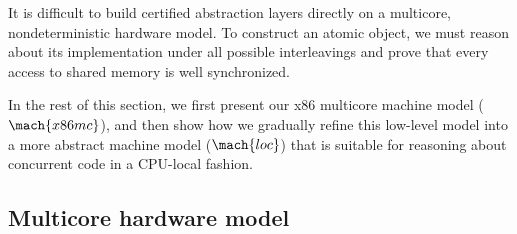  
It is difficult to build certified abstraction layers directly on a
multicore, nondeterministic hardware model. To construct an atomic
object, we must reason about its implementation under all possible
interleavings and prove that every access to shared memory is well
synchronized.


In the rest of this section, we first present our x86 multicore
machine model ($\mach{x86mc}$), and then show how we gradually refine
this low-level model into a more abstract machine model ($\mach{loc}$)
that is suitable for reasoning about concurrent code in a CPU-local
fashion.

\subsection{Multicore hardware model}
\label{ssec:spec:x86mc}

